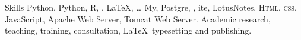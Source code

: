 
\begin{rubric}{Skills}
	Python, Python, R, , \LaTeX, \ldots
\entry*[Databases]
	My, Postgre, , ite, LotusNotes.
	\textsc{Html, css}, JavaScript, Apache Web Server, Tomcat Web Server.
\entry*[Misc.]
	Academic research, teaching, training, consultation, \LaTeX\ typesetting and publishing.
\end{rubric}
